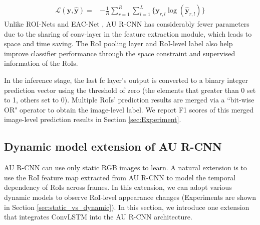 \documentclass[5p,twocolumn]{elsarticle}
\begin{document}
\begin{equation}\label{eqn:sigmoid_cross_entropy}
\begin{aligned}
\mathcal{L}(\mathbf{y}, \hat{\mathbf{y}}) =& -\frac{1}{R} \sum_{r=1}^{R}\sum_{l=1}^{L} \{\mathbf{y}_{r,l} \log(\hat{\mathbf{y}}_{r,l}) \}
\end{aligned}
\end{equation}
Unlike ROI-Nets \cite{li2017action} and EAC-Net \cite{li2017eac}, AU R-CNN has considerably fewer parameters due to the sharing of conv-layer in the feature extraction module, which leads to space and time saving. The RoI pooling layer and RoI-level label also help improve classifier performance through the space constraint and supervised information of the RoIs.
 
In the inference stage, the last fc layer's output is converted to a binary integer prediction vector using the threshold of zero (the elements that greater than 0 set to 1, others set to 0). Multiple RoIs' prediction results are merged via a ``bit-wise OR" operator to obtain the image-level label. We report F1 scores of this merged image-level prediction results in Section \ref{sec:Experiment}.
 

\subsection{Dynamic model extension of AU R-CNN}
\label{sec:method_AR_conv-lstm}
AU R-CNN can use only static RGB images to learn. A natural extension is to use the RoI feature map extracted from AU R-CNN to model the temporal dependency of RoIs across frames. In this extension, we can adopt various dynamic models to observe RoI-level appearance changes (Experiments are shown in Section \ref{sec:static_vs_dynamic}). In this section, we introduce one extension that integrates ConvLSTM \cite{xingjian2015convolutional} into the AU R-CNN architecture.
\end{document}
